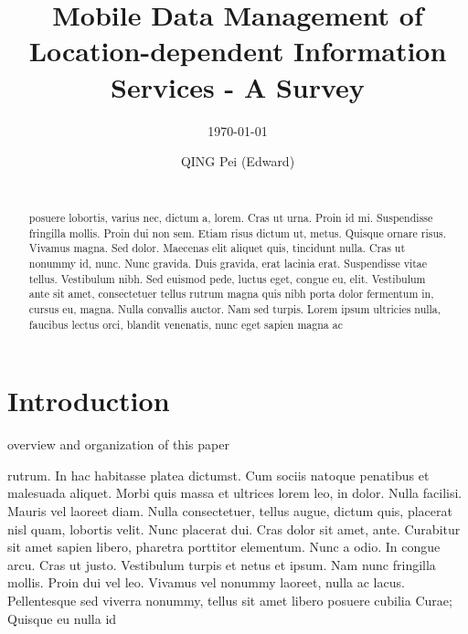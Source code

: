 \documentclass{acm_proc_article-sp}
\begin{document}
\title{Mobile Data Management of Location-dependent Information Services - A Survey}
\subtitle{\today}

\author{
\alignauthor QING Pei (Edward)\\
\\
}

\maketitle

\begin{abstract}
posuere lobortis, varius nec, dictum a, lorem. Cras ut urna. Proin id mi. Suspendisse fringilla mollis. Proin dui non sem. Etiam risus dictum ut, metus. Quisque ornare risus. Vivamus magna. Sed dolor. Maecenas elit aliquet quis, tincidunt nulla. Cras ut nonummy id, nunc. Nunc gravida. Duis gravida, erat lacinia erat. Suspendisse vitae tellus. Vestibulum nibh. Sed euismod pede, luctus eget, congue eu, elit. Vestibulum ante sit amet, consectetuer tellus rutrum magna quis nibh porta dolor fermentum in, cursus eu, magna. Nulla convallis auctor. Nam sed turpis. Lorem ipsum ultricies nulla, faucibus lectus orci, blandit venenatis, nunc eget sapien magna ac
\end{abstract}


\section{Introduction} %
\label{sec:intro}
overview and organization of this paper

rutrum. In hac habitasse platea dictumst. Cum sociis natoque penatibus et malesuada aliquet. Morbi quis massa et ultrices lorem leo, in dolor. Nulla facilisi. Mauris vel laoreet diam. Nulla consectetuer, tellus augue, dictum quis, placerat nisl quam, lobortis velit. Nunc placerat dui. Cras dolor sit amet, ante. Curabitur sit amet sapien libero, pharetra porttitor elementum. Nunc a odio. In congue arcu. Cras ut justo. Vestibulum turpis et netus et ipsum. Nam nunc fringilla mollis. Proin dui vel leo. Vivamus vel nonummy laoreet, nulla ac lacus. Pellentesque sed viverra nonummy, tellus sit amet libero posuere cubilia Curae; Quisque eu nulla id
\end{document}
